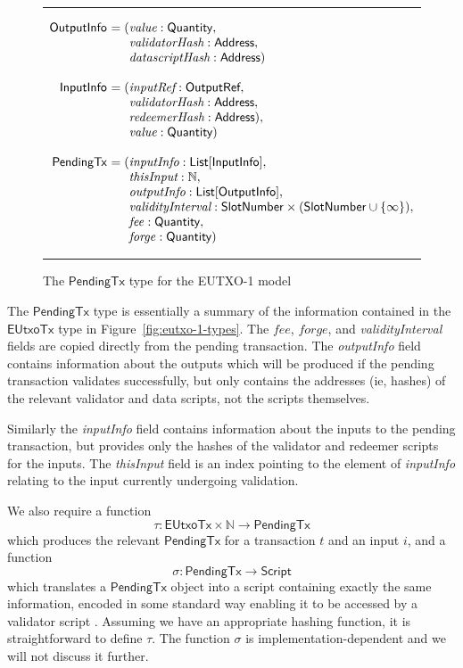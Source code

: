 \documentclass[a4paper]{article}
\renewcommand{\i}{\textit}  %
\newcommand{\s}{\textsf}  %
\theoremstyle{definition}  %
\newenvironment{arraydefs}[1]{\setlength{\arraycolsep}{0pt}\begin{array}{#1}}{\end{array}}
\newcommand\rfskip{7pt}
\newenvironment{ruledfigure}[1]{\begin{figure}[#1]\hrule\vspace{\rfskip}}{\vspace{\rfskip}\hrule\end{figure}}
\newcommand{\List}[1]{\ensuremath{\s{List}[#1]}}
\newcommand{\script}{\ensuremath{\s{Script}}}
\newcommand{\ptx}{\ensuremath{\s{PendingTx}}}
\newcommand{\mi}[1]{\ensuremath{\mathit{#1}}}
\newcommand{\forge}{\mi{forge}}
\newcommand{\fee}{\mi{fee}}
\newcommand{\msf}[1]{\ensuremath{\mathsf{#1}}}
\newcommand{\slotnum}{\msf{SlotNumber}}
\newcommand{\eutxotx}{\msf{EUtxoTx}}
\newcommand{\qty}{\ensuremath{\s{Quantity}}}
\newcommand\N{\ensuremath{\mathbb{N}}}
\begin{document}
\begin{ruledfigure}{H}
  \[
  \begin{arraydefs}{rll}
    
    \s{OutputInfo } &= (& \i{value}: \qty,\\
    && \i{validatorHash}: \s{Address},\\
    &&  \i{datascriptHash}: \s{Address})\\
    \\
    \s{InputInfo } & = (&\i{inputRef}: \s{OutputRef},\\
                 && \i{validatorHash}: \s{Address},\\
                 && \i{redeemerHash}: \s{Address}),\\
                 && \i{value}: \qty)\\
     \\
     \ptx\s{ } &= (&\i{inputInfo}: \List{\s{InputInfo}},\\
     &&\i{thisInput}: \N,\\
     &&\i{outputInfo}: \List{\s{OutputInfo}},\\
     &&\i{validityInterval}: \slotnum \times (\slotnum \cup \{\infty\}),\\
     && \fee: \qty,\\
     &&\forge: \qty)
   \end{arraydefs}
 \]
  \caption{The $\ptx$ type for the EUTXO-1 model}
  \label{fig:ptx-1-types}
\end{ruledfigure}
\noindent The $\ptx$ type is essentially a summary of the information
contained in the $\eutxotx$ type in
Figure~\ref{fig:eutxo-1-types}. The \fee, \forge, and
\i{validityInterval} fields are copied directly from the pending
transaction.  The \i{outputInfo} field contains information about the
outputs which will be produced if the pending transaction validates
successfully, but only contains the addresses (ie, hashes) of the
relevant validator and data scripts, not the scripts themselves.

Similarly the \i{inputInfo} field contains information about the
inputs to the pending transaction, but provides only the hashes of the
validator and redeemer scripts for the inputs.  The \i{thisInput}
field is an index pointing to the element of \i{inputInfo}
relating to the input currently undergoing validation.

\medskip
\noindent We also require a function
$$
\tau: \eutxotx \times \N \rightarrow \ptx
$$
which produces the relevant $\ptx$ for a transaction $t$ and an input
$i$, and a function
$$
\sigma: \ptx \rightarrow \script
$$
which translates a $\ptx$ object into a script containing exactly the
same information, encoded in some standard way enabling it to be accessed
by a validator script .  Assuming we have an appropriate hashing
function, it is straightforward to define $\tau$.  The function
$\sigma$ is implementation-dependent and we will not discuss it
further.
\end{document}
